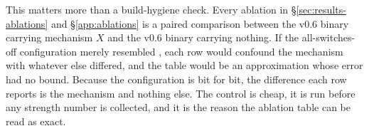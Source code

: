 This matters more than a build-hygiene check. Every ablation in
\S\ref{sec:results-ablations} and \S\ref{app:ablations} is a paired comparison
between the v0.6 binary carrying mechanism $X$ and the v0.6 binary carrying
nothing. If the all-switches-off configuration merely resembled \vfive{}, each
row would confound the mechanism with whatever else differed, and the table would
be an approximation whose error had no bound. Because the configuration is
\vfive{} bit for bit, the difference each row reports is the mechanism and
nothing else. The control is cheap, it is run before any strength number is
collected, and it is the reason the ablation table can be read as exact.
